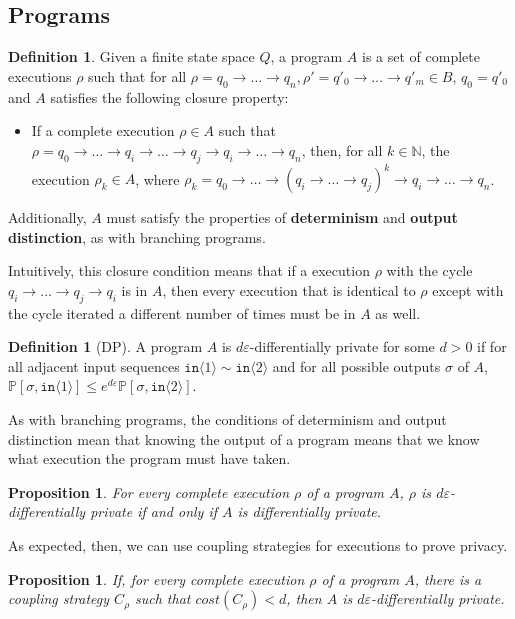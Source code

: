 \documentclass[12pt]{article}
\newcommand{\NN}{\mathbb{N}}
\newcommand{\PP}{\mathbb{P}}
\newcommand{\brangle}[1]{\langle #1 \rangle}
\newtheorem{prop}[thm]{Proposition}
\theoremstyle{definition}
\newtheorem{defn}[thm]{Definition}
\begin{document}
\subsection{Programs}


\begin{defn}
    Given a finite state space $Q$, a program $A$ is a set of complete executions $\rho$ such that for all $\rho=q_0\to\ldots\to q_n, \rho'=q'_0\to\ldots\to q'_m\in B$, $q_0=q'_0$ and $A$ satisfies the following closure property:\begin{itemize}
        \item If a complete execution $\rho\in A$ such that $\rho = q_0\to \ldots \to q_i \to \ldots \to q_j \to q_i\to \ldots \to q_n$, then, for all $k\in \NN$, the execution $\rho_k\in A$, where $\rho_k = q_0\to \ldots \to (q_i \to \ldots \to q_j)^k \to q_i\to \ldots \to q_n$.
    \end{itemize}
    Additionally, $A$ must satisfy the properties of \textbf{determinism} and \textbf{output distinction}, as with branching programs. 
\end{defn}

Intuitively, this closure condition means that if a execution $\rho$ with the cycle $q_i\to \ldots \to q_j\to q_i$ is in $A$, then every execution that is identical to $\rho$ except with the cycle iterated a different number of times must be in $A$ as well. 

\begin{defn}[DP]
    A program $A$ is $d\varepsilon$-differentially private for some $d>0$ if for all adjacent input sequences $\texttt{in}\brangle{1}\sim \texttt{in}\brangle{2}$ and for all possible outputs $\sigma$ of $A$, $\PP[\sigma, \texttt{in}\brangle{1}]\leq e^{d\varepsilon}\PP[\sigma, \texttt{in}\brangle{2}]$.
\end{defn}

As with branching programs, the conditions of determinism and output distinction mean that knowing the output of a program means that we know what execution the program must have taken. 

\begin{prop}
    For every complete execution $\rho$ of a program $A$, $\rho$ is $d\varepsilon$-differentially private if and only if $A$ is differentially private. 
\end{prop}

As expected, then, we can use coupling strategies for executions to prove privacy.

\begin{prop}
    If, for every complete execution $\rho$ of a program $A$, there is a coupling strategy $C_\rho$ such that $cost(C_\rho)<d$, then $A$ is $d\varepsilon$-differentially private.
\end{prop}
\end{document}
